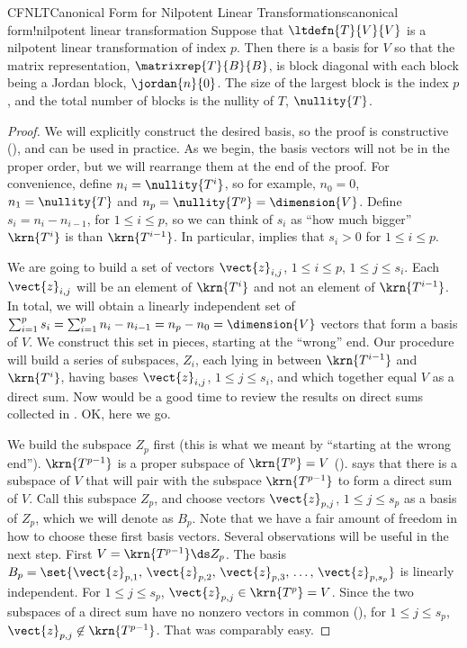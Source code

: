 %
\begin{theorem}{CFNLT}{Canonical Form for Nilpotent Linear Transformations}{canonical form!nilpotent linear transformation}
Suppose that $\ltdefn{T}{V}{V}$ is a nilpotent linear transformation of index $p$.  Then there is a basis for $V$ so that the matrix representation, $\matrixrep{T}{B}{B}$, is block diagonal with each block being a Jordan block, $\jordan{n}{0}$.  The size of the largest block is the index $p$, and the total number of blocks is the nullity of $T$, $\nullity{T}$.
\end{theorem}
%
\begin{proof}
We will explicitly construct the desired basis, so the proof is constructive (), and can be used in practice.  As we begin, the basis vectors will not be in the proper order, but we will rearrange them at the end of the proof.  For convenience, define $n_i=\nullity{T^i}$, so for example, $n_0=0$, $n_1=\nullity{T}$ and $n_p=\nullity{T^p}=\dimension{V}$.  Define $s_i=n_i-n_{i-1}$, for $1\leq i\leq p$, so we can think of $s_i$ as ``how much bigger'' $\krn{T^i}$ is than $\krn{T^{i-1}}$.  In particular,  implies that $s_i>0$ for $1\leq i\leq p$.\par
%
We are going to build a set of vectors $\vect{z}_{i,j}$, $1\leq i\leq p$, $1\leq j\leq s_i$.  Each $\vect{z}_{i,j}$ will be an element of $\krn{T^i}$ and not an element of $\krn{T^{i-1}}$.  In total, we will obtain a linearly independent set of $\sum_{i=1}^{p}s_i=\sum_{i=1}^{p}n_i-n_{i-1}=n_p-n_0=\dimension{V}$ vectors that form a basis of $V$.  We construct this set in pieces, starting at the ``wrong'' end.  Our procedure will build a series of subspaces, $Z_i$, each lying in between  $\krn{T^{i-1}}$ and $\krn{T^i}$, having bases $\vect{z}_{i,j}$, $1\leq j\leq s_i$, and which together equal $V$ as a direct sum.  Now would be a good time to review the results on direct sums collected in .   OK, here we go.\par
%
We build the subspace $Z_p$ first (this is what we meant by ``starting at the wrong end'').  $\krn{T^{p-1}}$ is a proper subspace of $\krn{T^p}=V$ ().   says that there is a subspace of $V$ that will pair with the subspace $\krn{T^{p-1}}$ to form a direct sum of $V$.  Call this subspace $Z_p$, and choose vectors $\vect{z}_{p,j}$, $1\leq j\leq s_p$ as a basis of $Z_p$, which we will denote as $B_p$.   Note that we have a fair amount of freedom in how to choose these first basis vectors.  Several observations will be useful in the next step.  First $V=\krn{T^{p-1}}\ds Z_p$.  The basis $B_p=\set{\vect{z}_{p,1},\,\vect{z}_{p,2},\,\vect{z}_{p,3},\,\dots,\,\vect{z}_{p,s_p}}$ is linearly independent.  For $1\leq j\leq s_p$, $\vect{z}_{p,j}\in\krn{T^p}=V$.  Since the two subspaces of a direct sum have no nonzero vectors in common (), for $1\leq j\leq s_p$, $\vect{z}_{p,j}\not\in\krn{T^{p-1}}$.  That was comparably easy.\par

\end{proof}
